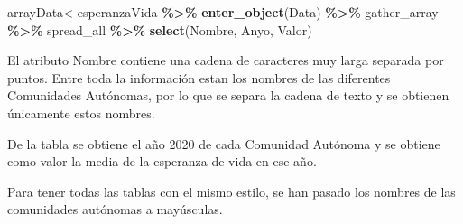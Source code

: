 \documentclass[
]{article}
\newenvironment{Shaded}{\begin{snugshade}}{\end{snugshade}}
\newcommand{\ControlFlowTok}[1]{\textcolor[rgb]{0.13,0.29,0.53}{\textbf{#1}}}
\newcommand{\DecValTok}[1]{\textcolor[rgb]{0.00,0.00,0.81}{#1}}
\newcommand{\FunctionTok}[1]{\textcolor[rgb]{0.13,0.29,0.53}{\textbf{#1}}}
\newcommand{\NormalTok}[1]{#1}
\newcommand{\OtherTok}[1]{\textcolor[rgb]{0.56,0.35,0.01}{#1}}
\newcommand{\SpecialCharTok}[1]{\textcolor[rgb]{0.81,0.36,0.00}{\textbf{#1}}}
\newcommand{\StringTok}[1]{\textcolor[rgb]{0.31,0.60,0.02}{#1}}
\begin{document}
\begin{Shaded}
\begin{Highlighting}[]
\NormalTok{arrayData}\OtherTok{\textless{}{-}}\NormalTok{esperanzaVida }\SpecialCharTok{\%\textgreater{}\%}
  \FunctionTok{enter\_object}\NormalTok{(Data) }\SpecialCharTok{\%\textgreater{}\%} 
\NormalTok{  gather\_array }\SpecialCharTok{\%\textgreater{}\%} 
\NormalTok{  spread\_all }\SpecialCharTok{\%\textgreater{}\%} 
  \FunctionTok{select}\NormalTok{(Nombre, Anyo, Valor) }
\end{Highlighting}
\end{Shaded}

El atributo Nombre contiene una cadena de caracteres muy larga separada
por puntos. Entre toda la información estan los nombres de las
diferentes Comunidades Autónomas, por lo que se separa la cadena de
texto y se obtienen únicamente estos nombres.

\begin{Shaded}
\end{Shaded}

De la tabla se obtiene el año 2020 de cada Comunidad Autónoma y se
obtiene como valor la media de la esperanza de vida en ese año.

Para tener todas las tablas con el mismo estilo, se han pasado los
nombres de las comunidades autónomas a mayúsculas.
\end{document}
